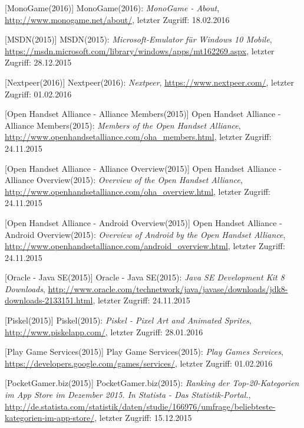 \begin{thebibliography}{}
[MonoGame(2016)] MonoGame(2016): \emph{MonoGame - About},
\url{http://www.monogame.net/about/}, letzter Zugriff: 18.02.2016

[MSDN(2015)] MSDN(2015): \emph{Microsoft-Emulator für Windows 10 Mobile},
\url{https://msdn.microsoft.com/library/windows/apps/mt162269.aspx}, letzter Zugriff: 28.12.2015

[Nextpeer(2016)] Nextpeer(2016): \emph{Nextpeer},
\url{https://www.nextpeer.com/}, letzter Zugriff: 01.02.2016

[Open Handset Alliance - Alliance Members(2015)] Open Handset Alliance - Alliance Members(2015): \emph{Members of the Open Handset Alliance},
\url{http://www.openhandsetalliance.com/oha_members.html}, letzter Zugriff: 24.11.2015

[Open Handset Alliance - Alliance Overview(2015)] Open Handset Alliance - Alliance Overview(2015): \emph{Overview of the Open Handset Alliance},
\url{http://www.openhandsetalliance.com/oha_overview.html}, letzter Zugriff: 24.11.2015

[Open Handset Alliance - Android Overview(2015)] Open Handset Alliance - Android Overview(2015): \emph{Overview of Android by the Open Handset Alliance},
\url{http://www.openhandsetalliance.com/android_overview.html}, letzter Zugriff: 24.11.2015

[Oracle - Java SE(2015)] Oracle - Java SE(2015): \emph{Java SE Development Kit 8 Downloads},
\url{http://www.oracle.com/technetwork/java/javase/downloads/jdk8-downloads-2133151.html}, letzter Zugriff: 24.11.2015

[Piskel(2015)] Piskel(2015): \emph{Piskel - Pixel Art and Animated Sprites},
\url{http://www.piskelapp.com/}, letzter Zugriff: 28.01.2016

[Play Game Services(2015)] Play Game Services(2015): \emph{Play Games Services},
\url{https://developers.google.com/games/services/}, letzter Zugriff: 01.02.2016

[PocketGamer.biz(2015)] PocketGamer.biz(2015): \emph{Ranking der Top-20-Kategorien im App Store im Dezember 2015. In Statista - Das Statistik-Portal.},
\url{http://de.statista.com/statistik/daten/studie/166976/umfrage/beliebteste-kategorien-im-app-store/}, letzter Zugriff: 15.12.2015


\end{thebibliography}
